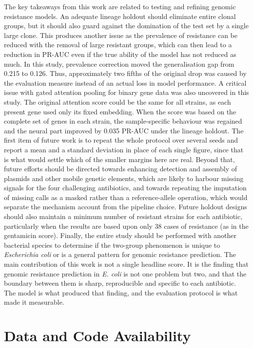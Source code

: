 \documentclass[journal]{IEEEtran}
\begin{document}
The key takeaways from this work are related to testing and refining genomic
resistance models. An adequate lineage holdout should eliminate entire clonal groups,
but it should also guard against the domination of the test set by a single large
clone. This produces another issue as the prevalence of resistance can be reduced with
the removal of large resistant groups, which can then lead to a reduction in PR-AUC
even if the true ability of the model has not reduced as much. In this study,
prevalence correction moved the generalisation gap from 0.215 to 0.126. Thus,
approximately two fifths of the original drop was caused by the evaluation measure
instead of an actual loss in model performance. A critical issue with gated attention
pooling for binary gene data was also uncovered in this study. The original attention
score could be the same for all strains, as each present gene used only its fixed
embedding. When the score was based on the complete set of genes in each strain, the
sample-specific behaviour was regained and the neural part improved by 0.035 PR-AUC
under the lineage holdout. The first item of future work is to repeat the whole
protocol over several seeds and report a mean and a standard deviation in place of
each single figure, since that is what would settle which of the smaller margins here
are real. Beyond that, future efforts should be directed towards enhancing
detection and assembly of plasmids and other mobile genetic elements, which are likely
to harbour missing signals for the four challenging antibiotics, and towards repeating
the imputation of missing calls as a masked rather than a reference-allele operation,
which would separate the mechanism account from the pipeline choice. Future holdout
designs should also maintain a minimum number of resistant strains for each
antibiotic, particularly when the results are based upon only 38 cases of resistance
(as in the gentamicin score). Finally, the entire study should be performed with
another bacterial species to determine if the two-group phenomenon is unique to
\textit{Escherichia coli} or is a general pattern for genomic resistance prediction.
The main contribution of this work is not a single headline score. It is the finding
that genomic resistance prediction in \textit{E. coli} is not one problem but two, and
that the boundary between them is sharp, reproducible and specific to each antibiotic.
The model is what produced that finding, and the evaluation protocol is what made it
measurable.

\section*{Data and Code Availability}
\end{document}

